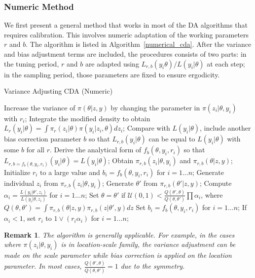 \documentclass[10pt]{article}
\newtheorem{remark}{Remark}
\begin{document}
\subsubsection{Numeric Method}

We first present a general method that works in most of the DA algorithms that requires calibration. This involves numeric adaptation of the working parameters $r$ and $b$. The algorithm is listed in Algorithm~\ref{numerical_cda}. After the variance and bias adjustment terms are included, the procedures consists of two parts: in the tuning period, $r$ and $b$ are adapted using $L_{r,b}(y_i\theta)/L(y_i|\theta)$ at each step; in the sampling period, those parameters are fixed to ensure ergodicity.
 
 
\begin{algorithm}[H]
		\caption{Variance Adjusting CDA (Numeric)}
		\label{numerical_cda}
		    \begin{algorithmic}
		\State Increase the variance of $\pi(\theta| z,y)$ by changing the parameter in $\pi(z_i |\theta,y_i)$ with $r_i$;
		\State Integrate the modified density to obtain $L_r(y_i|\theta)= \int \pi_r (z_i|\theta) \pi(y_i|z_i,\theta) d z_i$; 
		\State Compare with $L(y_i|\theta)$, include another bias correction parameter $b$ so that $L_{r,b}(y_i|\theta)$ can be equal to $L(y_i|\theta)$ with some $b$ for all $r$.
		\State Derive the analytical form of $f_b(\theta,y_i,r_i)$ so that $L_{r,b={f_b(\theta,y_i,r_i)}}(y_i|\theta)=L(y_i|\theta)$;
		\State Obtain $\pi_{r,b}(z_i|\theta, y_i)$ and  $\pi_{r,b}(\theta| z, y)$;
		\State Initialize $r_i$ to a large value and $b_i= f_b(\theta,y_i, r_i)$  for $i=1\ldots n$;
		\State {}
		\State Generate individual $z_i$ from $\pi_{r,b}(z_i|\theta, y_i)$;
		\State Generate $\theta'$ from $\pi_{r,b}(\theta'|z, y)$;
		\State Compute $\alpha_i = \frac{L( y_i|\theta', z_i ) }{L( y_i|\theta, z_i )}$  for $i=1\ldots n$;
		\State Set $\theta=\theta'$ if $\mathcal{U}(0,1)< \frac{Q(\theta',\theta)}{Q(\theta,\theta')}\prod \alpha_i$, where $Q(\theta,\theta') = \int  \pi_{r,b}(\theta| z, y) \pi_{r,b}(z|\theta', y)d z$
		\State {}
			\State Set $b_i= f_b(\theta,y_i, r_i)$ for $i=1\ldots n$;
			\State If $\alpha_i<1$, set $r_i$ to $1 \vee (r_i \alpha_i)$  for $i=1\ldots n$;
		\EndIf
		\EndFor
		\end{algorithmic}
\end{algorithm}

\begin{remark}
The algorithm is generally applicable. For example, in the cases where $\pi(z_i | \theta,y_i)$ is in location-scale family, the variance adjustment can be made on the scale parameter while bias correction is applied on the location parameter. In most cases, $\frac{Q(\theta',\theta)}{Q(\theta,\theta')}=1$ due to the symmetry.
\end{remark}
\end{document}
